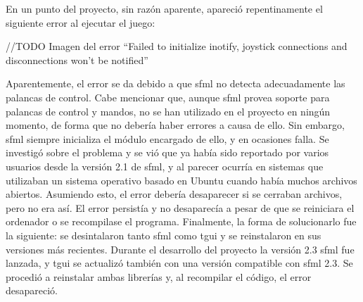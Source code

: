 	En un punto del proyecto, sin razón aparente, apareció repentinamente el siguiente error al ejecutar el juego:

	//TODO Imagen del error ``Failed to initialize inotify, joystick connections and disconnections won't be notified''

	Aparentemente, el error se da debido a que \acrshort{sfml} no detecta adecuadamente las palancas de control. Cabe mencionar que, aunque \acrshort{sfml} provea soporte para palancas de control y mandos, no se han utilizado en el proyecto en ningún momento, de forma que no debería haber errores a causa de ello. Sin embargo, \acrshort{sfml} siempre inicializa el módulo encargado de ello, y en ocasiones falla. Se investigó sobre el problema y se vió que ya había sido reportado por varios usuarios desde la versión 2.1 de \acrshort{sfml}, y al parecer ocurría en sistemas que utilizaban un sistema operativo basado en Ubuntu cuando había muchos archivos abiertos. Asumiendo esto, el error debería desaparecer si se cerraban archivos, pero no era así. El error persistía y no desaparecía a pesar de que se reiniciara el ordenador o se recompilase el programa. Finalmente, la forma de solucionarlo fue la siguiente: se desintalaron tanto \acrshort{sfml} como \acrshort{tgui} y se reinstalaron en sus versiones más recientes. Durante el desarrollo del proyecto la versión 2.3 \acrshort{sfml} fue lanzada, y \acrshort{tgui} se actualizó también con una versión compatible con \acrshort{sfml} 2.3. Se procedió a reinstalar ambas librerías y, al recompilar el código, el error desapareció.
